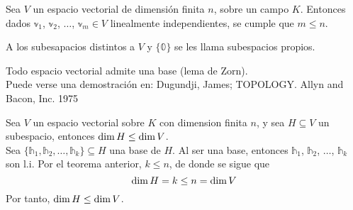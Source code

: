 \begin{theorem}
    Sea $V$ un espacio vectorial de dimensión finita $n$, sobre un campo $K$. Entonces dados $\mathbb{v}_1$, $\mathbb{v}_2$, $\dots$, $\mathbb{v}_m \in V$ linealmente independientes, se cumple que $m \leq n$.
\end{theorem}

\begin{remark}
    A los subesapacios distintos a $V$ y $\{ \mathbb{0} \}$ se les llama subespacios propios.
\end{remark}

\begin{observation}
    Todo espacio vectorial admite una base (lema de Zorn).\\
    \demostracion Puede verse una demostración en: Dugundji, James; TOPOLOGY. Allyn and Bacon, Inc. 1975
\end{observation}

\begin{theorem}\label{theorem:teorema1.5.1}
    Sea $V$ un espacio vectorial sobre $K$ con dimension finita $n$, y sea $H \subseteq V$ un subespacio, entonces $\operatorname{dim} H \leq \operatorname{dim} V$. \\
    \demostracion Sea $\{ \mathbb{h}_1,  \mathbb{h}_2,  \dots,  \mathbb{h}_k \} \subseteq H$ una base de $H$. Al ser una base, entonces $\mathbb{h}_1$, $\mathbb{h}_2$, $\dots$, $\mathbb{h}_k$ son l.i. Por el teorema anterior, $k \leq n$, de donde se sigue que
    $$\operatorname{dim} H = k \leq n = \operatorname{dim} V$$
    Por tanto, $\operatorname{dim} H \leq \operatorname{dim} V$.
\end{theorem}

